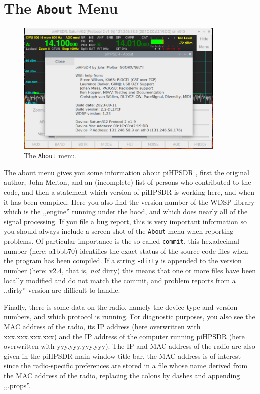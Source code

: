 \documentclass[12pt]{book}
\def\rett#1{\texttt{\color{red}#1}}
\def\bltt#1{\texttt{\color{blue}#1}}
\def\pH{pi\-HPSDR }
\begin{document}
\clearpage
\section{The \texttt{About} Menu}

\begin{figure}[ht]
\center
\includegraphics[width=10cm]{AboutMenu.png}
\caption{The \bltt{About} menu.}
\end{figure}

The about menu gives you some information about \pH, first the original author,
John Melton,
and an (incomplete) list
of persons who contributed to the code, and then a statement which version of \pH
is working here, and when it has been compiled. Here you also find the version number of the WDSP
 library which is the ,,engine''
running under the hood, and which does nearly all of the signal processing. If you file a bug report,
this is very important information so you should always include a screen shot of the \bltt{About}
menu when reporting problems. Of particular importance is the so-called \rett{commit},
this hexadecimal number (here: a1bbb70) identifies the exact status of the source code files
when the program has been compiled. If a string \texttt{-dirty} is appended to the version number
(here: v2.4, that is, \textit{not} dirty) this means that one or more files have been locally  modified
and do not match the commit, and problem reports from a ,,dirty'' version are difficult to handle.

Finally, there is
some data on the radio, namely the device type and version numbers, and which protocol is running.
For diagnostic purposes, you also see the MAC address of the radio, its IP address (here overwritten
with xxx.xxx.xxx.xxx)
and the
IP address of the computer running \pH (here overwritten with yyy.yyy.yyy.yyy). The IP and MAC address of
the radio are also given in the \pH main window title bar, the MAC address is of interest since the radio-specific
preferences are stored in a file whose name derived from the MAC address of the radio, replacing
the colons by dashes and appending ,,.props''.
\end{document}

